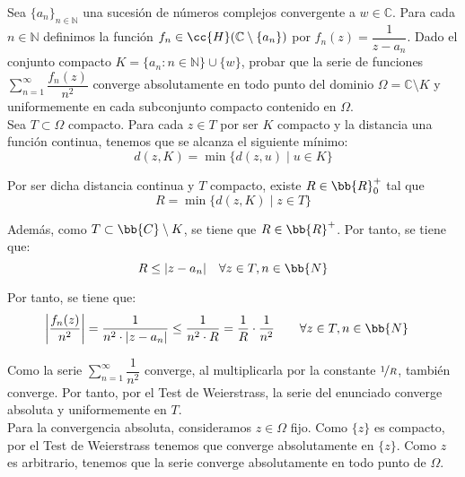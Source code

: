 \documentclass[12pt]{article}
\begin{document}
    \begin{ejercicio}[3 puntos]
        Sea $\{a_n\}_{n \in \mathbb{N}}$ una sucesión de números complejos convergente a $w \in \mathbb{C}$. Para cada $n \in \mathbb{N}$ definimos la función $f_n \in \cc{H}(\mathbb{C} \setminus \{a_n\})$ por $f_n(z) = \dfrac{1}{z - a_n}$. Dado el conjunto compacto $K = \{a_n : n \in \mathbb{N}\} \cup \{w\}$, probar que la serie de funciones $\displaystyle \sum_{n=1}^{\infty} \dfrac{f_n(z)}{n^2}$ converge absolutamente en todo punto del dominio $\Omega = \mathbb{C} \setminus K$ y uniformemente en cada subconjunto compacto contenido en $\Omega$.\\

        Sea $T\subset \Omega$ compacto. Para cada $z \in T$ por ser $K$ compacto y la distancia una función continua, tenemos que se alcanza el siguiente mínimo:
        \begin{equation*}
            d(z, K) = \min \{d(z, u) \mid u \in K\}
        \end{equation*}

        Por ser dicha distancia continua y $T$ compacto, existe $R\in \bb{R}^+_0$ tal que
        \begin{equation*}
            R=\min \{d(z, K) \mid z \in T\}
        \end{equation*}

        Además, como $T\subset \bb{C}\setminus K$, se tiene que $R\in \bb{R}^+$. Por tanto, se tiene que:
        \begin{equation*}
            R\leq |z - a_n| \quad \forall z\in T, n\in \bb{N}
        \end{equation*}

        Por tanto, se tiene que:
        \begin{align*}
            \left|\dfrac{f_n(z)}{n^2}\right| &= \dfrac{1}{n^2\cdot |z - a_n|} \leq \dfrac{1}{n^2\cdot R} = \dfrac{1}{R}\cdot \dfrac{1}{n^2}\qquad \forall z\in T, n\in \bb{N}
        \end{align*}

        Como la serie $\displaystyle \sum_{n=1}^{\infty} \dfrac{1}{n^2}$ converge, al multiplicarla por la constante $\nicefrac{1}{R}$, también converge. Por tanto, por el Test de Weierstrass, la serie del enunciado converge absoluta y uniformemente en $T$.\\

        Para la convergencia absoluta, consideramos $z\in \Omega$ fijo. Como $\{z\}$ es compacto, por el Test de Weierstrass tenemos que converge absolutamente en $\{z\}$. Como $z$ es arbitrario, tenemos que la serie converge absolutamente en todo punto de $\Omega$.
    \end{ejercicio}
\end{document}
